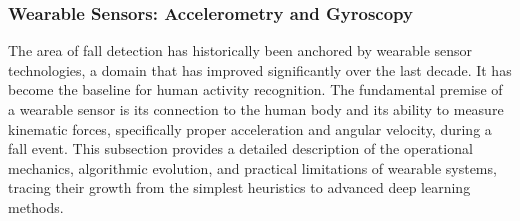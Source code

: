 \documentclass[11pt, a4paper, twoside]{article}
\begin{document}
\subsubsection{Wearable Sensors: Accelerometry and Gyroscopy}
The area of fall detection has historically been anchored by wearable sensor technologies, a domain that has improved significantly over the last decade. It has become the baseline for human activity recognition. The fundamental premise of a wearable sensor is its connection to the human body and its ability to measure kinematic forces, specifically proper acceleration and angular velocity, during a fall event. This subsection provides a detailed description of the operational mechanics, algorithmic evolution, and practical limitations of wearable systems, tracing their growth from the simplest heuristics to advanced deep learning methods.
\newline
\newline
\end{document}
